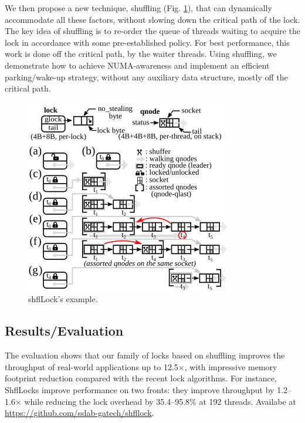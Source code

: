 We then propose a new technique, shuffling (Fig. \ref{fig:shfllock}), that can dynamically accommodate all these factors, without slowing down the critical path of the lock. The key idea of shuffling is to re-order the queue of threads waiting to acquire the lock in accordance with some pre-established policy. For best performance, this work is done off the critical path, by the waiter threads. Using shuffling, we demonstrate how to achieve NUMA-awareness and implement an efficient parking/wake-up strategy, without any auxiliary data structure, mostly off the critical path.  

\begin{figure}[h]
    \centering
    \includegraphics[width=0.7\linewidth]{shfllock.png} %
    \caption{shflLock's example.}	
    \label{fig:shfllock}
\end{figure}
\subsection{Results/Evaluation}
The evaluation shows that our family of locks based on shuffling improves the throughput of real-world applications up to 12.5$\times$, with impressive memory footprint reduction compared with the recent lock algorithms. For instance,  ShflLocks improve performance on two fronts: they improve throughput by 1.2–1.6$\times$ while reducing the lock overhead by 35.4–95.8\% at 192 threads.  Availabe at \url{https://github.com/sslab-gatech/shfllock}.
